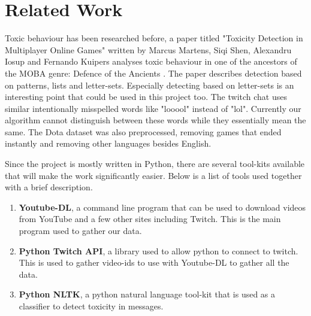 \documentclass[final]{report}
\begin{document}
\chapter{Related Work}
\label{ch:relatedwork}

Toxic behaviour has been researched before, a paper titled "Toxicity Detection in Multiplayer Online Games" written by Marcus Martens, Siqi Shen, Alexandru Iosup and Fernando Kuipers analyses toxic behaviour in one of the ancestors of the MOBA genre: Defence of the Ancients \cite{marcustoxicity}. The paper describes detection based on patterns, lists and letter-sets. Especially detecting based on letter-sets is an interesting point that could be used in this project too. The twitch chat uses similar intentionally misspelled words like "looool" instead of "lol". Currently our algorithm cannot distinguish between these words while they essentially mean the same. The Dota dataset was also preprocessed, removing games that ended instantly and removing other languages besides English.

Since the project is mostly written in Python, there are several tool-kits available that will make the work significantly easier. Below is a list of tools used together with a brief description.

\begin{enumerate}
	\item \textbf{Youtube-DL}, a command line program that can be used to download videos from YouTube and a few other sites including Twitch. This is the main program used to gather our data. 
	\item \textbf{Python Twitch API}, a library used to allow python to connect to twitch. This is used to gather video-ids to use with Youtube-DL to gather all the data.
	\item \textbf{Python NLTK}, a python natural language tool-kit that is used as a classifier to detect toxicity in messages.
\end{enumerate}
\end{document}
